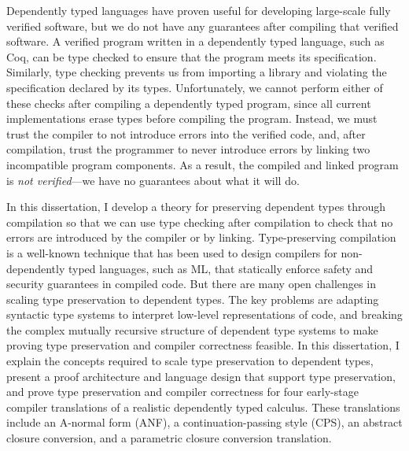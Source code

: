 Dependently typed languages have proven useful for developing large-scale fully
verified software, but we do not have any guarantees after compiling that
verified software.
A verified program written in a dependently typed language, such as Coq, can be
type checked to ensure that the program meets its specification.
Similarly, type checking prevents us from importing a library and
violating the specification declared by its types.
Unfortunately, we cannot perform either of these checks after compiling a
dependently typed program, since all current implementations erase types before
compiling the program.
Instead, we must trust the compiler to not introduce errors into the
verified code, and, after compilation, trust the programmer to never introduce
errors by linking two incompatible program components.
As a result, the compiled and linked program is
\emph{not verified}---we have no guarantees about what it will do.

In this dissertation, I develop a theory for preserving dependent types through
compilation so that we can use type checking after compilation to check that no
errors are introduced by the compiler or by linking.
Type-preserving compilation is a well-known technique that has been used to
design compilers for non-dependently typed languages, such as ML, that
statically enforce safety and security guarantees in compiled code.
But there are many open challenges in scaling type preservation to dependent
types.
The key problems are adapting syntactic type systems to interpret low-level
representations of code, and breaking the complex mutually recursive structure
of dependent type systems to make proving type preservation and compiler
correctness feasible.
In this dissertation, I explain the concepts required to scale type preservation
to dependent types, present a proof architecture and language design that
support type preservation, and prove type preservation and compiler correctness
for four early-stage compiler translations of a realistic dependently typed
calculus.
These translations include an A-normal form (ANF), a continuation-passing style
(CPS), an abstract closure conversion, and a parametric closure conversion
translation.
